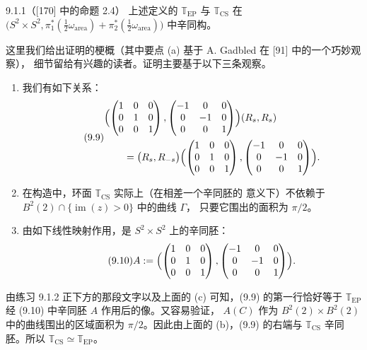 \begin{wthm}{9.1.1}（[170] 中的命题 2.4）
  上述定义的 $\mathbb{T}_{\mathrm{EP}}$ 与 $\mathbb{T}_{\mathrm{CS}}$ 在
  $\bigl(S^2\times S^2,\pi_1^*(\tfrac12\omega_{\mathrm{area}})
  +\pi_2^*(\tfrac12\omega_{\mathrm{area}})\bigr)$ 中辛同构。
\end{wthm}

\begin{wproof}
  这里我们给出证明的梗概（其中要点 (a) 基于 A. Gadbled 在 [91] 中的一个巧妙观察），
  细节留给有兴趣的读者。证明主要基于以下三条观察。
  \begin{enumerate}[label=(\alph*)]
    \item 我们有如下关系：
    \begin{equation}\tag{9.9}
    \begin{aligned}
      &\Bigl(\begin{pmatrix}1&0&0\\0&1&0\\0&0&1\end{pmatrix},
      \begin{pmatrix}-1&0&0\\0&-1&0\\0&0&1\end{pmatrix}\Bigr)(R_s,R_s)\\
      &\qquad=\bigl(R_s,R_{-s}\bigr)
      \Bigl(\begin{pmatrix}1&0&0\\0&1&0\\0&0&1\end{pmatrix},
      \begin{pmatrix}-1&0&0\\0&-1&0\\0&0&1\end{pmatrix}\Bigr).
    \end{aligned}
    \end{equation}
    \item 在构造中，环面 $\mathbb{T}_{\mathrm{CS}}$ 实际上（在相差一个辛同胚的
      意义下）不依赖于 $B^2(2)\cap\{\operatorname{im}(z)>0\}$ 中的曲线 $\Gamma$，
      只要它围出的面积为 $\pi/2$。
    \item 由如下线性映射作用，是 $S^2\times S^2$ 上的辛同胚：
    \begin{equation}\tag{9.10}
      A:=\Bigl(\begin{pmatrix}1&0&0\\0&1&0\\0&0&1\end{pmatrix},
      \begin{pmatrix}-1&0&0\\0&-1&0\\0&0&1\end{pmatrix}\Bigr).
    \end{equation}
  \end{enumerate}
  由练习 9.1.2 正下方的那段文字以及上面的 (c) 可知，(9.9) 的第一行恰好等于
  $\mathbb{T}_{\mathrm{EP}}$ 经 (9.10) 中辛同胚 $A$ 作用后的像。又容易验证，
  $A(C)$ 作为 $B^2(2)\times B^2(2)$ 中的曲线围出的区域面积为 $\pi/2$。因此由上面的
  (b)，(9.9) 的右端与 $\mathbb{T}_{\mathrm{CS}}$ 辛同胚。所以
  $\mathbb{T}_{\mathrm{CS}}\simeq\mathbb{T}_{\mathrm{EP}}$。
\end{wproof}
